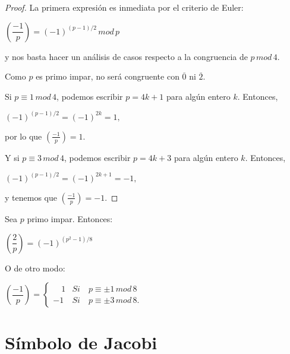\begin{proof}
	La primera expresión es inmediata por el criterio de Euler:
	\begin{center}
	$
	\left( \dfrac{-1}{p}\right) = (-1)^{(p-1)/2} \, mod \, p
	$
	\end{center}	
	y nos basta hacer un análisis de casos respecto a la congruencia de $p \, mod \, 4$.
	
	Como $p$ es primo impar, no será congruente con $\overline{0}$ ni $\overline{2}$.
	
	Si $p \equiv 1 \, mod \, 4$, podemos escribir $p = 4k+1$ para algún entero $k$. Entonces,
	\begin{center}
	$
	(-1)^{(p-1)/2} = (-1)^{2k}  = 1,
	$
	\end{center}
	por lo que $\left( \frac{-1}{p}\right) = 1$.

	Y si $p \equiv 3 \, mod \, 4$, podemos escribir $p = 4k+3$ para algún entero $k$. Entonces,
	\begin{center}
		$
		(-1)^{(p-1)/2} = (-1)^{2k+1}  = -1,
		$
	\end{center}
	y tenemos que $\left( \frac{-1}{p}\right) = -1$.
\end{proof}



\begin{proposition}
	Sea $p$ primo impar. Entonces:
	
	\begin{center}
		$
		\left( \dfrac{2}{p}\right) = (-1)^{(p^2-1)/8}
		$
	\end{center}
	
	
	O de otro modo:
	
	\begin{center}
		$
		\left(\dfrac{-1}{p}\right) = \begin{cases}
		\quad 1 & Si\quad p \equiv \pm 1 \, mod \, 8 \\
		-1 & Si\quad p \equiv \pm 3 \, mod \, 8.
		\end{cases}
		$
	\end{center}
	
\end{proposition}





\hfil

\section{Símbolo de Jacobi}

